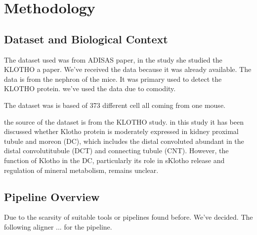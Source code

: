 

\chapter{Methodology}
\label{Chapter2}


\section{Dataset and Biological Context}
The dataset used was from ADISAS paper, in the study she studied the KLOTHO a paper. We've received the data because it was already available. 
The data is from the nephron of the mice. It was primary used to detect the KLOTHO protein. 
we've used the data due to comodity. 

The dataset was is based of 373 different cell all coming from one mouse. 

the source of the dataset is from the KLOTHO study. in this study it has been discussed whether Klotho protein is moderately expressed in kidney proximal tubule and moreon (DC), which includes the distal convoluted  abundant in the distal convolutitubule (DCT) and connecting tubule (CNT). However, the function of Klotho in the DC, particularly its role in sKlotho release and regulation of mineral metabolism, remains unclear.


\section{Pipeline Overview}
Due to the scarsity of suitable tools or pipelines found before. We've decided. The following aligner ... for the pipeline. 


